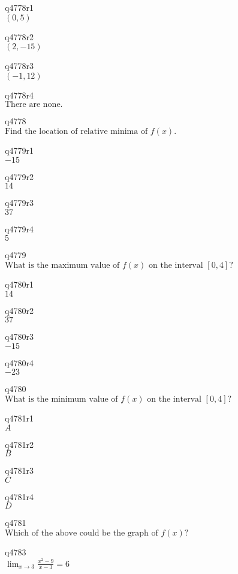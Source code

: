 q4778r1\\
\(\displaystyle (0, 5) \)

q4778r2\\
\(\displaystyle (2, -15) \)

q4778r3\\
\(\displaystyle (-1, 12) \)

q4778r4\\
\(\displaystyle \text{There are none.} \)

q4778\\
\(\displaystyle \text{Find the location of relative minima of } f(x). \)

q4779r1\\
\(\displaystyle -15 \)

q4779r2\\
\(\displaystyle 14 \)

q4779r3\\
\(\displaystyle 37 \)

q4779r4\\
\(\displaystyle 5 \)

q4779\\
\(\displaystyle \text{What is the maximum value of } f(x) \text{ on the interval } [0, 4]? \)

q4780r1\\
\(\displaystyle 14 \)

q4780r2\\
\(\displaystyle 37 \)

q4780r3\\
\(\displaystyle -15 \)

q4780r4\\
\(\displaystyle -23 \)

q4780\\
\(\displaystyle \text{What is the minimum value of } f(x) \text{ on the interval } [0, 4]? \)

q4781r1\\
\(\displaystyle A \)

q4781r2\\
\(\displaystyle B \)

q4781r3\\
\(\displaystyle C \)

q4781r4\\
\(\displaystyle D \)

q4781\\
\(\displaystyle \text{Which of the above could be the graph of } f(x)? \)

q4783\\
\(\displaystyle \lim_{x \rightarrow 3} \frac{x^2-9}{x-3} = 6 \)

